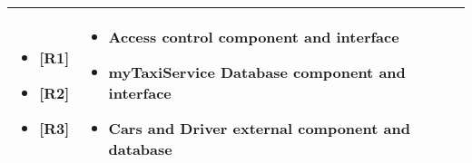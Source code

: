 \begin{center}
\begin{longtable}{|p{}|p{}|}
\begin{itemize}
	\begin{itemize}
		\item {[}R1{]}
		\item {[}R2{]}
		\item {[}R3{]}
	\end{itemize}\end{itemize} &\MPtrue \begin{itemize}
	\item Access control component and interface
	\item myTaxiService Database component and interface
	\item Cars and Driver external component and database
\end{itemize}\\
\hline
\end{longtable}
\end{center}